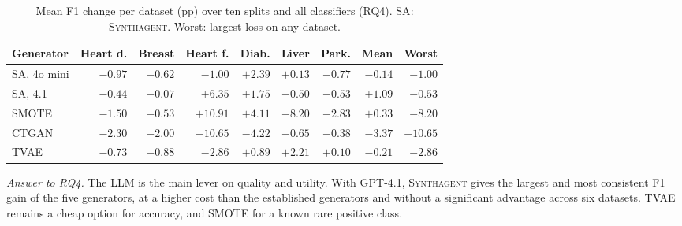 \documentclass[conference]{IEEEtran}
\newcommand{\system}{\textsc{Synthagent}\xspace}
\newcommand{\best}[1]{\textbf{#1}}
\begin{document}
\begin{table}[t]
\centering
\caption{Mean F1 change per dataset (pp) over ten splits and all classifiers (RQ4). \textsc{SA}: \system. Worst: largest loss on any dataset.}
\label{tab:robust}
\scriptsize
\setlength{\tabcolsep}{1pt}
\begin{tabular*}{\columnwidth}{@{\extracolsep{\fill}}lrrrrrrrr@{}}
\toprule
Generator & Heart d. & Breast & Heart f. & Diab. & Liver & Park. & Mean & Worst \\
\midrule
\textsc{SA}, 4o mini & $-0.97$ & $-0.62$ & $-1.00$ & $+2.39$ & $+0.13$ & $-0.77$ & $-0.14$ & $-1.00$ \\
\textsc{SA}, 4.1 & $-0.44$ & $-0.07$ & $+6.35$ & $+1.75$ & $-0.50$ & $-0.53$ & \best{$+1.09$} & \best{$-0.53$} \\
SMOTE & $-1.50$ & $-0.53$ & $+10.91$ & $+4.11$ & $-8.20$ & $-2.83$ & $+0.33$ & $-8.20$ \\
CTGAN & $-2.30$ & $-2.00$ & $-10.65$ & $-4.22$ & $-0.65$ & $-0.38$ & $-3.37$ & $-10.65$ \\
TVAE & $-0.73$ & $-0.88$ & $-2.86$ & $+0.89$ & $+2.21$ & $+0.10$ & $-0.21$ & $-2.86$ \\
\bottomrule
\end{tabular*}
\end{table}

\noindent\textit{Answer to RQ4.} The LLM is the main lever on quality and utility. With GPT-4.1, \system gives the largest and most consistent F1 gain of the five generators, at a higher cost than the established generators and without a significant advantage across six datasets. TVAE remains a cheap option for accuracy, and SMOTE for a known rare positive class.

\end{document}
